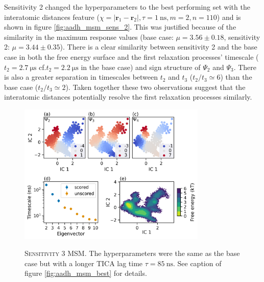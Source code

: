 Sensitivity 2 changed the hyperparameters to the best performing set with the interatomic distances feature ($\chi = |\mathbf{r}_{1} - \mathbf{r}_{2}|, \tau = \SI{1}{\nano\second}, m=2, n=110$) and is shown in figure \ref{fig:aadh_msm_sens_2}.  This was justified because of the similarity in the maximum response values (base case: $\mu=3.56 \pm 0.18$, sensitivity 2: $\mu=3.44 \pm 0.35$). There is a clear similarity between sensitivity 2 and the base case in both the free energy surface and the first relaxation processes' timescale ($t_{2} = \SI{2.7}{\micro\second}$ cf.$t_{2} = \SI{2.2}{\micro\second}$ in the base case) and sign structure of $\Psi_{2}$ and $\Psi_{3}$.  There is also a greater separation in timescales between $t_{2}$ and $t_{3}$ ($t_{2}/t_{3} \simeq 6$) than the base case ($t_{2}/t_{3} \simeq 2$). Taken together these two observations suggest that the interatomic distances potentially resolve the first relaxation processes similarly. 

\begin{figure}
    \centering
    \caption[Sensitivity 3 MSM]{\textsc{Sensitivity 3 MSM}. The hyperparameters were the same as the base case but with a  longer TICA lag time $\tau = \SI{85}{\nano\second}$.  See caption of figure \ref{fig:aadh_msm_best} for details.}
    \includegraphics[width=0.8\textwidth]{chapters/msm_optimization/figures/aadh_msm_sens_3.png}
    \label{fig:aadh_msm_sens_3}
\end{figure}

